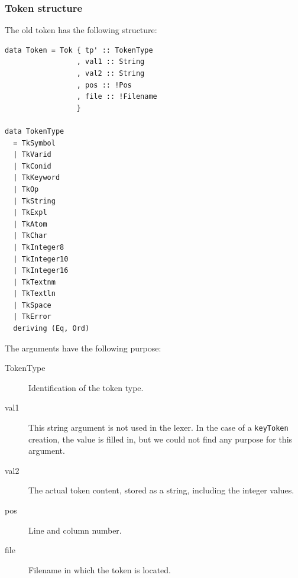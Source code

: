 \subsubsection{Token structure}
The old token has the following structure:

\begin{verbatim}
data Token = Tok { tp' :: TokenType
                 , val1 :: String
                 , val2 :: String
                 , pos :: !Pos
                 , file :: !Filename
                 }

data TokenType
  = TkSymbol
  | TkVarid
  | TkConid
  | TkKeyword
  | TkOp
  | TkString
  | TkExpl
  | TkAtom
  | TkChar
  | TkInteger8
  | TkInteger10
  | TkInteger16
  | TkTextnm
  | TkTextln
  | TkSpace
  | TkError
  deriving (Eq, Ord)
\end{verbatim}
%
The arguments have the following purpose:
\begin{description}
  \item[TokenType]
    Identification of the token type. %
  \item[val1]
    This string argument is not used in the lexer.
    In the case of a \texttt{keyToken} creation, the value is filled in, but we could not find any purpose for this argument.
  \item[val2]
    The actual token content, stored as a string, including the integer values.
  \item[pos]
    Line and column number.
  \item[file]
     Filename in which the token is located.
\end{description}

